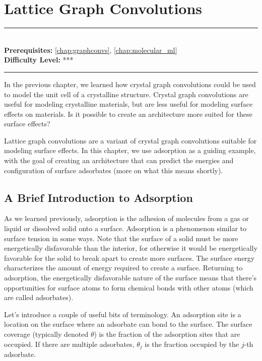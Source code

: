 \documentclass[book.tex]{subfiles}
\begin{document}
\chapter{Lattice Graph Convolutions}
\label{chap:lattice_graphconvs}
\noindent\rule{11cm}{0.4pt} \\
\textbf{Prerequisites:} \autoref{chap:graphconvs}, \autoref{chap:molecular_ml}   \\
\textbf{Difficulty Level:} *** \\
\noindent\rule{11cm}{0.4pt}
\vspace{5mm}

In the previous chapter, we learned how crystal graph convolutions could be used to model the unit cell of a crystalline structure. Crystal graph convolutions are useful for modeling crystalline materials, but are less useful for modeling surface effects on materials. Is it possible to create an architecture more suited for these surface effects?

Lattice graph convolutions are a variant of crystal graph convolutions suitable for modeling surface effects. In this chapter, we use adsorption as a guiding example, with the goal of creating an architecture that can predict the energies and configuration of surface adsorbates (more on what this means shortly).

\section{A Brief Introduction to Adsorption}

As we learned previously, adsorption is the adhesion of molecules from a gas or liquid or dissolved solid onto a surface. Adsorption is a phenomenon similar to surface tension in some ways. Note that the surface of a solid must be more energetically disfavorable than the interior, for otherwise it would be energetically favorable for the solid to break apart to create more surfaces. The surface energy characterizes the amount of energy required to create a surface. Returning to adsorption, the energetically disfavorable nature of the surface means that there’s opportunities for surface atoms to form chemical bonds with other atoms (which are called adsorbates). %

Let’s introduce a couple of useful bits of terminology. An adsorption site is a location on the surface where an adsorbate can bond to the surface. The surface coverage (typically denoted $\theta$) is the fraction of the adsorption sites that are occupied. If there are multiple adsorbates, $\theta_j$ is the fraction occupied by the $j$-th adsorbate.
\end{document}
